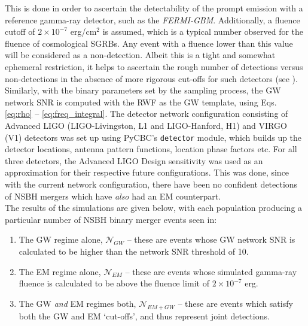     This is done in order to ascertain the detectability of the prompt emission with a
    reference gamma-ray detector, such as the \textit{FERMI-GBM}. Additionally, a fluence cutoff of $2 \times 10^{-7}$ erg/cm$^2$ is assumed, which is a typical number observed for the fluence of cosmological SGRBs. Any event with a fluence lower than this value will be
    considered as a non-detection. Albeit this is a tight and somewhat ephemeral
    restriction, it helps to ascertain the rough number of detections versus
    non-detections in the absence of more rigorous cut-offs for such detectors (see \cite{bhat_2016}).\\
    Similarly, with the binary parameters set by the sampling process, the GW network
    SNR is computed with the RWF as the GW template, using Eqs. \ref{eq:rho} --
    \ref{eq:freq_integral}. The detector network configuration consisting of Advanced
    LIGO (LIGO-Livingston, L1 and LIGO-Hanford, H1) and VIRGO (V1) detectors was set up
    using PyCBC's \texttt{detector} module, which builds up the detector locations,
    antenna pattern functions, location phase factors etc. For all three detectors, the
    Advanced LIGO Design sensitivity was used as an approximation for their respective
    future configurations. This was done, since with the current network configuration,
    there have been no confident detections of NSBH mergers which have \textit{also} had
    an EM counterpart.\\
    The results of the simulations are given below, with each population producing a
    particular number of NSBH binary merger events seen in:

    \begin{enumerate}

        \item The GW regime alone, $\boxed{\mathcal{N}_{GW}}$ -- these are events whose
            GW network SNR is calculated to be higher than the network SNR threshold of
            10.

        \item The EM regime alone, $\boxed{\mathcal{N}_{EM}}$ -- these are events whose
            simulated gamma-ray fluence is calculated to be above the fluence
            limit of $2 \times 10^{-7}$ erg.

        \item The GW \textit{and} EM regimes both, $\boxed{\mathcal{N}_{EM+GW}}$ --
            these are events which satisfy both the GW and EM `cut-offs', and thus
            represent joint detections.

    \end{enumerate}


